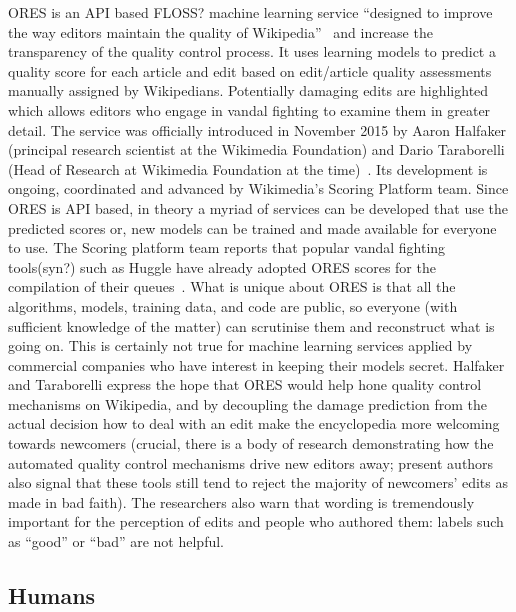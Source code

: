 ORES is an API based FLOSS? machine learning service ``designed to improve the way editors maintain the quality of Wikipedia''~\cite{HalTar2015} and increase the transparency of the quality control process.
It uses learning models to predict a quality score for each article and edit based on edit/article quality assessments manually assigned by Wikipedians.
Potentially damaging edits are highlighted which allows editors who engage in vandal fighting to examine them in greater detail.
The service was officially introduced in November 2015 by Aaron Halfaker (principal research scientist at the Wikimedia Foundation) and Dario Taraborelli (Head of Research at Wikimedia Foundation at the time)~\cite{HalTar2015}. %
Its development is ongoing, coordinated and advanced by Wikimedia's Scoring Platform team.
Since ORES is API based, in theory a myriad of services can be developed that use the predicted scores or, new models can be trained and made available for everyone to use.
The Scoring platform team reports that popular vandal fighting tools(syn?) such as Huggle have already adopted ORES scores for the compilation of their queues~\cite{HalTar2015}.
What is unique about ORES is that all the algorithms, models, training data, and code are public, so everyone (with sufficient knowledge of the matter) can scrutinise them and reconstruct what is going on.
This is certainly not true for machine learning services applied by commercial companies who have interest in keeping their models secret.
Halfaker and Taraborelli express the hope that ORES would help hone quality control mechanisms on Wikipedia, and by decoupling the damage prediction from the actual decision how to deal with an edit make the encyclopedia more welcoming towards newcomers
(crucial, there is a body of research demonstrating how the automated quality control mechanisms drive new editors away; present authors also signal that these tools still tend to reject the majority of newcomers' edits as made in bad faith).
The researchers also warn that wording is tremendously important for the perception of edits and people who authored them: labels such as ``good'' or ``bad'' are not helpful.

\subsection{Humans}

